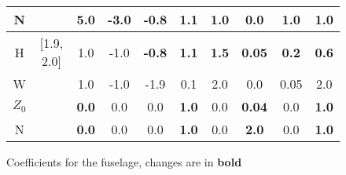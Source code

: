 \documentclass[12pt]{article}
\begin{document}
\begin{figure}[ht]
\begin{centering}
\begin{small}
\begin{tabular}{cccccccccc}
N           &                 & 5.0 & -3.0 & -0.8 & 1.1 & 1.0 & 0.0   & \textbf{1.0} & \textbf{1.0} \\
\hline
H          & [1.9, 2.0]  & 1.0             & -1.0 & \textbf{-0.8} & \textbf{1.1} & \textbf{1.5} & \textbf{0.05} & \textbf{0.2} & \textbf{0.6} \\
W          &                 & 1.0             & -1.0 &             -1.9 &             0.1 &             2.0 &             0.0   & 0.05           & 2.0 \\
$Z_{0}$ &                 & \textbf{0.0} & 0.0  &             0.0  & \textbf{1.0} &             0.0 & \textbf{0.04} & 0.0             & \textbf{1.0} \\
N           &                 & \textbf{0.0} & 0.0  &             0.0  & \textbf{1.0} &             0.0 & \textbf{2.0}   & 0.0             & \textbf{1.0} \\
\end{tabular}
\caption{Coefficients for the fuselage, changes are in \textbf{bold}}
\label{fuscoeff}
\end{small}
\end{centering}\end{figure}%
\end{document}
